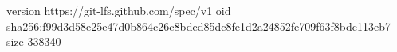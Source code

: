 version https://git-lfs.github.com/spec/v1
oid sha256:f99d3d58e25e47d0b864c26c8bded85dc8fe1d2a24852fe709f63f8bdc113eb7
size 338340
